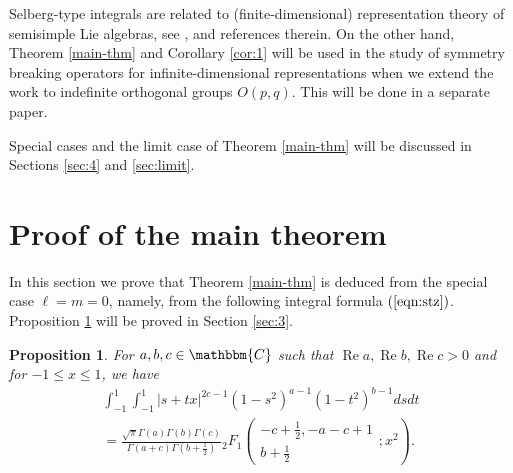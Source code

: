 \documentclass[12pt]{article}
\numberwithin{equation}{section}
\newcommand{\tmop}[1]{\ensuremath{\operatorname{#1}}}
\newtheorem{proposition}[corollary]{Proposition}
{\theorembodyfont{\rmfamily}\newtheorem{remark}[corollary]{Remark}}
\begin{document}
Selberg-type integrals are related to (finite-dimensional) representation
theory of semisimple Lie algebras, see {\cite{forrester2008importance}},
{\cite{tarasov2003selberg}} and references therein. On the other hand, Theorem
\ref{main-thm} and Corollary \ref{cor:1} will be used in the study of symmetry
breaking operators for infinite-dimensional representations when we extend the
work {\cite{kobayashi2015symmetry}} to indefinite orthogonal groups $O (p,
q)$. This will be done in a separate paper.

Special cases and the limit case of Theorem \ref{main-thm} will be discussed
in Sections \ref{sec:4} and \ref{sec:limit}.

\section{Proof of the main theorem}\label{sec:2}

In this section we prove that Theorem \ref{main-thm}
is deduced from the special case $\ell=m=0$, namely, from
the following
integral formula $(\ref{eqn:stz})$.
Proposition \ref{prop:2}
will be proved in Section
\ref{sec:3}.

\begin{proposition}
  \label{prop:2}For $a, b, c \in \mathbbm{C}$ such that $\tmop{Re} a,
  \tmop{Re} b, \tmop{Re} c > 0$ and for $- 1 \leqslant x \leqslant 1$, we have
  \begin{multline}
     \displaystyle\int_{- 1}^1 \displaystyle\int_{- 1}^1 | s + t x |^{2 c - 1} (1 - s^2)^{a - 1} (1 -
    t^2)^{b - 1} d s d t \\= \frac{\sqrt{\pi} \Gamma (a) \Gamma (b) \Gamma
    (c)}{\Gamma (a + c) \Gamma \left( b + \frac{1}{2} \right)}{}_2 F_1 \left(
    \begin{array}{c}
      - c + \frac{1}{2}, - a - c + 1\\
      b + \frac{1}{2}
    \end{array} ; x^2 \right) .  \label{eqn:stz}
  \end{multline}
\end{proposition}
\end{document}
